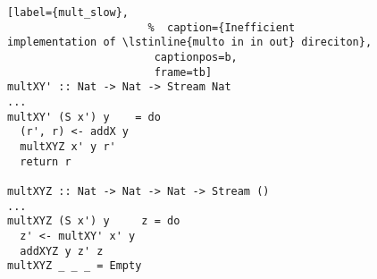 \begin{figure}[!t]
  \centering
  \begin{minipage}{\columnwidth}
    \begin{lstlisting}[label={mult_slow},
                      %  caption={Inefficient implementation of \lstinline{multo in in out} direciton},
                       captionpos=b,
                       frame=tb]
multXY' :: Nat -> Nat -> Stream Nat
...
multXY' (S x') y    = do
  (r', r) <- addX y
  multXYZ x' y r'
  return r

multXYZ :: Nat -> Nat -> Nat -> Stream ()
...
multXYZ (S x') y     z = do
  z' <- multXY' x' y
  addXYZ y z' z
multXYZ _ _ _ = Empty
    \end{lstlisting}
  \end{minipage}
\end{figure}
